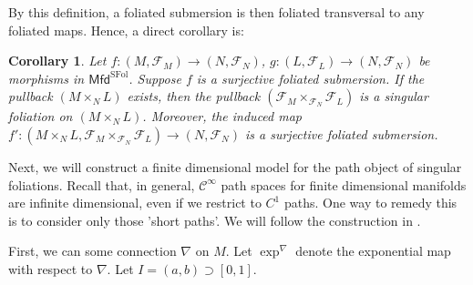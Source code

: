 \documentclass[12pt]{amsart}
\newtheorem{cor}[thm]{Corollary}
\theoremstyle{definition}
\theoremstyle{remark}
\numberwithin{equation}{section}
\newcommand{\CF}{{\mathcal F}}
\newcommand{\cinf}{{\mathcal C}^{\infty}}
\newcommand{\1}{{\mathbb{1}}}
\newcommand{\mfd}{\mathsf{Mfd}}
\newcommand{\sfol}{{\operatorname{SFol}}}
\begin{document}
By this definition, a foliated submersion is then foliated transversal to any  foliated maps. Hence, a direct corollary is:
\begin{cor}\label{pb3}
    Let $f:(M, \CF_M)
    \to (N, \CF_N)$, $g: (L, \CF_L) \to (N, \CF_N)$ be morphisms in $ \mfd^{\sfol}$. Suppose $f$ is a surjective foliated submersion. If the pullback $(M\times_N L)$ exists, then the pullback $(\CF_M\times_{\CF_N} \CF_L)$ is a singular foliation on $(M\times_N L)$. Moreover, the induced map $f': (M\times_N L, \CF_M\times_{\CF_N} \CF_L)\to (N, \CF_N)$ is a surjective foliated submersion.
\end{cor}

Next, we will construct a finite dimensional model for the path object of singular foliations. Recall that, in general, $\cinf$ path spaces for finite dimensional manifolds are infinite dimensional, even if we restrict to $C^1$ paths. One way to remedy this is to consider only those 'short paths'. We will follow the construction in \cite[Section 2.1] {BLX21}.

First, we can some connection $\nabla$ on $M$. Let $\exp^{\nabla}$ denote the exponential map with respect to $\nabla$. Let $I=(a,b) \supset [0,1]$.
\end{document}
